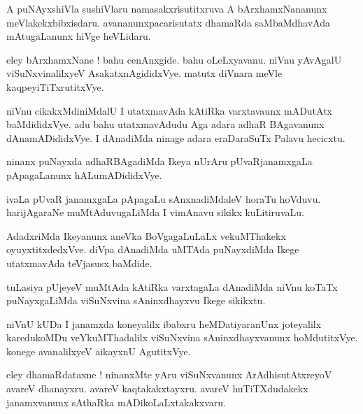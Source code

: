 \documentclass{article}
\begin{document}
\begin{mn}%
A puNAyxshiVla sushiVlaru namasakxrisutitxruva A bArxhamxNananunx meVlakekxbibxisdaru. 
avananunxpacarisutatx dhamaRda saMbaMdhavAda mAtugaLanunx hiVge heVLidaru.
\end{mn}

\begin{mn}%
eley bArxhamxNane ! bahu cenAnxgide. bahu oLeLxyavanu. niVnu yAvAgalU viSuNxvinalilxyeV 
AsakatxnAgididxVye. matutx diVnara meVle kaqpeyiTiTxrutitxVye.
\end{mn}

\begin{mn}%
niVnu cikakxMdiniMdalU I utatxmavAda kAtiRka varxtavaunx mADutAtx baMdididxVye. adu bahu 
utatxmavAdudu Aga adara adhaR BAgavanunx dAnamADididxVye. I dAnadiMda ninage adara eraDaraSuTx 
Palavu hecicxtu.
\end{mn}

\begin{mn}%
ninanx puNayxda adhaRBAgadiMda Ikeya nUrAru pUvaRjanamxgaLa pApagaLanunx hALumADididxVye.
\end{mn}

\begin{mn}%
ivaLa pUvaR janamxgaLa pApagaLu sAnxnadiMdaleV horaTu hoVduvu. harijAgaraNe muMtAduvugaLiMda I 
vimAnavu sikikx kuLitiruvaLu.
\end{mn}

\begin{mn}%
AdadxriMda Ikeyanunx aneVka BoVgagaLuLaLx vekuMThakekx oyuyxtitxdedxVve. diVpa dAnadiMda uMTAda 
puNayxdiMda Ikege utatxmavAda teVjasusx baMdide.
\end{mn}

\begin{mn}%
tuLasiya pUjeyeV muMtAda kAtiRka varxtagaLa dAnadiMda niVnu koTaTx puNayxgaLiMda viSuNxvina 
sAninxdhayxvu Ikege sikikxtu.
\end{mn}

\begin{mn}%
niVnU kUDa I janamxda koneyalilx ibabxru heMDatiyaranUnx joteyalilx karedukoMDu veYkuMThadalilx 
viSuNxvina sAninxdhayxvanunx hoMdutitxVye. konege avanalilxyeV aikayxnU AgutitxVye.
\end{mn}

\begin{mn}%
eley dhamaRdataxne ! ninanxMte yAru viSuNxvanunx ArAdhisutAtxreyoV avareV dhanayxru. avareV 
kaqtakakxtayxru. avareV huTiTXdudakekx janamxvanunx sAthaRka mADikoLaLxtakakxvaru.
\end{mn}
\end{document}
